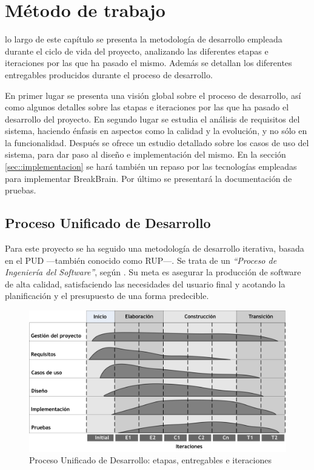 \chapter{Método de trabajo}
\label{chap:metodo}

 lo largo de este capítulo se presenta la metodología de desarrollo empleada durante el ciclo de vida del proyecto, analizando las diferentes etapas e iteraciones por las que ha pasado el mismo. Además se detallan los diferentes entregables producidos durante el proceso de desarrollo.

En primer lugar se presenta una visión global sobre el proceso de desarrollo, así como algunos detalles sobre las etapas e iteraciones por las que ha pasado el desarrollo del proyecto. En segundo lugar se estudia el análisis de requisitos del sistema, haciendo énfasis en aspectos como la calidad y la evolución, y no sólo en la funcionalidad. Después se ofrece un estudio detallado sobre los casos de uso del sistema, para dar paso al diseño e implementación del mismo. En la sección \ref{sec::implementacion} se hará también un repaso por las tecnologías empleadas para implementar BreakBrain. Por último se presentará la documentación de pruebas.

\section{Proceso Unificado de Desarrollo}
\label{sec::pud}

Para este proyecto se ha seguido una metodología de desarrollo iterativa, basada en el \ac{PUD} ---también conocido como \ac{RUP}---. Se trata de un \emph{``Proceso de Ingeniería del Software''}, según \cite{Rational1998}. Su meta es asegurar la producción de software de alta calidad, satisfaciendo las necesidades del usuario final y acotando la planificación y el presupuesto de una forma predecible.

\begin{figure}[h]
  \begin{center}
    \includegraphics[width=\textwidth]{images/pud.png}
    \caption{Proceso Unificado de Desarrollo: etapas, entregables e iteraciones}
    \label{fig::pud}
  \end{center}
\end{figure}


